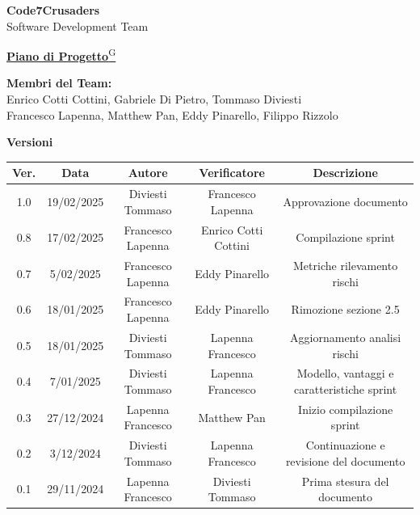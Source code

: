 \documentclass{article}
\begin{document}
\begin{titlepage}
    {\Huge \textbf{Code7Crusaders}}\\
    \vspace{0.5cm}
    {\Large Software Development Team}\\
    \vspace{2cm}

    {\large \href{https://code7crusaders.github.io/docs/RTB/documentazione_interna/glossario.html#piano-di-progetto}{\textbf{Piano di Progetto}\textsuperscript{G}}}\\
    \vspace{5cm}


    \textbf{Membri del Team:}\\
    Enrico Cotti Cottini, Gabriele Di Pietro, Tommaso Diviesti \\
    Francesco Lapenna, Matthew Pan, Eddy Pinarello, Filippo Rizzolo \\
    \vspace{0.5cm}

    \vspace{1cm}
\end{titlepage}



\newpage
\begin{table}[h!]
\centering
\textbf{Versioni} \\ %
\vspace{2mm} %
\begin{tabular}{|c|c|c|c|c|}
    \hline
    \textbf{Ver.} & \textbf{Data} & \textbf{Autore} & \textbf{Verificatore} & \textbf{Descrizione} \\
    \hline
    1.0 & 19/02/2025 & Diviesti Tommaso & Francesco Lapenna & Approvazione documento \\
    0.8 & 17/02/2025 & Francesco Lapenna & Enrico Cotti Cottini & Compilazione sprint \\
    0.7 & 5/02/2025 & Francesco Lapenna & Eddy Pinarello & Metriche rilevamento rischi \\
    0.6 & 18/01/2025 & Francesco Lapenna & Eddy Pinarello & Rimozione sezione 2.5 \\
    0.5 & 18/01/2025 & Diviesti Tommaso & Lapenna Francesco & Aggiornamento analisi rischi \\
    0.4 & 7/01/2025 & Diviesti Tommaso & Lapenna Francesco & Modello, vantaggi e caratteristiche sprint \\
    0.3 & 27/12/2024 & Lapenna Francesco & Matthew Pan & Inizio compilazione sprint \\
    0.2 & 3/12/2024 & Diviesti Tommaso & Lapenna Francesco & Continuazione e revisione del documento \\
    0.1 & 29/11/2024 & Lapenna Francesco & Diviesti Tommaso & Prima stesura del documento \\
    \hline
\end{tabular}
\end{table}
\end{document}
